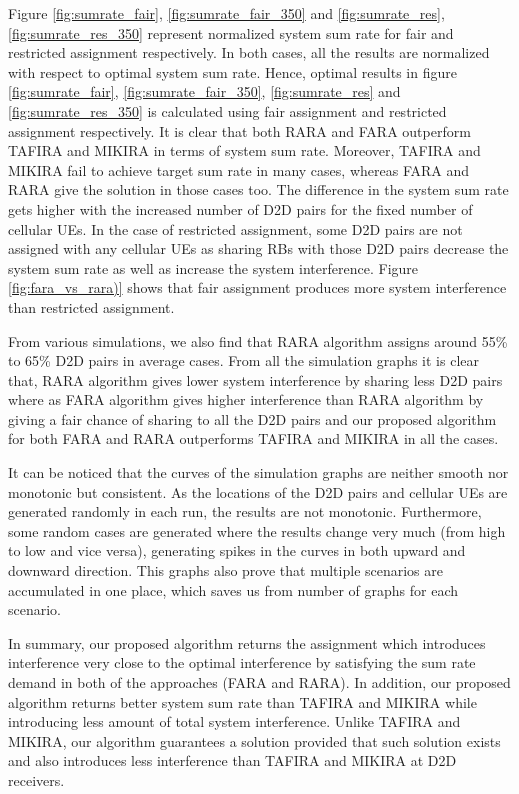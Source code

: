 \documentclass{ieeeaccess}
\begin{document}
\smallskip
 
Figure \ref{fig:sumrate_fair}, \ref{fig:sumrate_fair_350} and \ref{fig:sumrate_res}, \ref{fig:sumrate_res_350} represent normalized system sum rate for fair and restricted assignment respectively. In both cases, all the results are normalized with respect to optimal system sum rate. Hence, optimal results in figure \ref{fig:sumrate_fair}, \ref{fig:sumrate_fair_350}, \ref{fig:sumrate_res} and \ref{fig:sumrate_res_350} is calculated using fair assignment and  restricted assignment respectively. It is clear that both RARA and FARA outperform TAFIRA and MIKIRA in terms of system sum rate. Moreover, TAFIRA and MIKIRA fail to achieve target sum rate in many cases, whereas FARA and RARA give the solution in those cases too. The difference in the system sum rate gets higher with the increased number of D2D pairs for the fixed number of cellular UEs. In the case of restricted assignment, some D2D pairs are not assigned with any cellular UEs as sharing RBs with those D2D pairs decrease the system sum rate as well as increase the system interference. Figure \ref{fig:fara_vs_rara)} shows that fair assignment produces more system interference than restricted assignment.

\smallskip
 
From various simulations, we also find that RARA algorithm assigns around 55\% to 65\% D2D pairs in average cases. From all the simulation graphs it is clear that, RARA algorithm gives lower system interference by sharing less D2D pairs where as FARA algorithm gives higher interference than RARA algorithm by giving a fair chance of sharing to all the D2D pairs and our proposed algorithm for both FARA and RARA outperforms TAFIRA and MIKIRA in all the cases.

\smallskip
 
It can be noticed that the curves of the simulation graphs are neither smooth nor monotonic but consistent. As the locations of the D2D pairs and cellular UEs are generated randomly in each run, the results are not monotonic. Furthermore, some random cases are generated where the results change very much (from high to low and vice versa), generating spikes in the curves in both upward and downward direction. This graphs also prove that multiple scenarios are accumulated in one place, which saves us from number of graphs for each scenario. 
 
\smallskip
 
In summary, our proposed algorithm returns the assignment which introduces interference very close to the optimal interference by satisfying the sum rate demand in both of the approaches (FARA and RARA). In addition, our proposed algorithm returns better system sum rate than TAFIRA and MIKIRA while introducing less amount of total system interference. Unlike TAFIRA and MIKIRA, our algorithm guarantees a solution provided that such solution exists and also introduces less interference than TAFIRA and MIKIRA at D2D receivers. 
\end{document}
